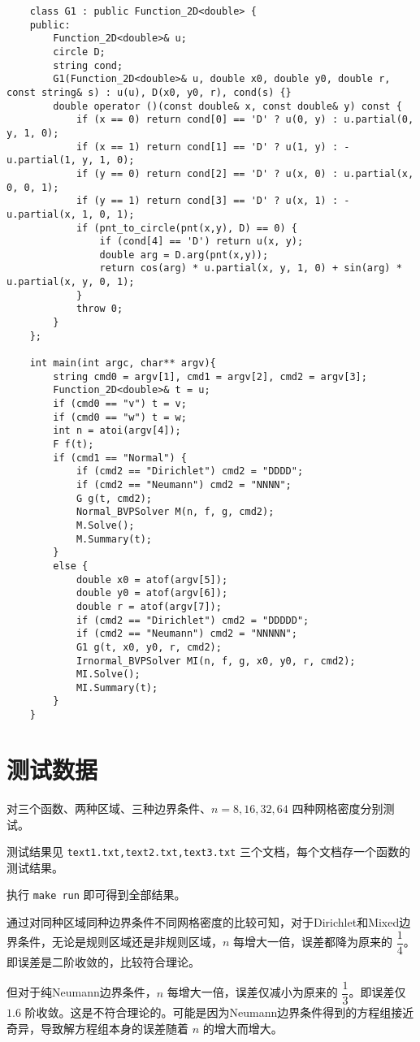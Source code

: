 \documentclass{ctexart}
\begin{document}
\begin{lstlisting}
    class G1 : public Function_2D<double> {
    public:
        Function_2D<double>& u;
        circle D;
        string cond;
        G1(Function_2D<double>& u, double x0, double y0, double r, const string& s) : u(u), D(x0, y0, r), cond(s) {}
        double operator ()(const double& x, const double& y) const {
            if (x == 0) return cond[0] == 'D' ? u(0, y) : u.partial(0, y, 1, 0);
            if (x == 1) return cond[1] == 'D' ? u(1, y) : -u.partial(1, y, 1, 0);
            if (y == 0) return cond[2] == 'D' ? u(x, 0) : u.partial(x, 0, 0, 1);
            if (y == 1) return cond[3] == 'D' ? u(x, 1) : -u.partial(x, 1, 0, 1);
            if (pnt_to_circle(pnt(x,y), D) == 0) {
                if (cond[4] == 'D') return u(x, y);
                double arg = D.arg(pnt(x,y));
                return cos(arg) * u.partial(x, y, 1, 0) + sin(arg) * u.partial(x, y, 0, 1);
            }
            throw 0;
        }
    };
    
    int main(int argc, char** argv){
        string cmd0 = argv[1], cmd1 = argv[2], cmd2 = argv[3];
        Function_2D<double>& t = u;
        if (cmd0 == "v") t = v;
        if (cmd0 == "w") t = w;
        int n = atoi(argv[4]);
        F f(t);
        if (cmd1 == "Normal") {
            if (cmd2 == "Dirichlet") cmd2 = "DDDD";
            if (cmd2 == "Neumann") cmd2 = "NNNN";
            G g(t, cmd2);
            Normal_BVPSolver M(n, f, g, cmd2);
            M.Solve();
            M.Summary(t);
        }
        else {
            double x0 = atof(argv[5]);
            double y0 = atof(argv[6]);
            double r = atof(argv[7]);
            if (cmd2 == "Dirichlet") cmd2 = "DDDDD";
            if (cmd2 == "Neumann") cmd2 = "NNNNN";
            G1 g(t, x0, y0, r, cmd2);
            Irnormal_BVPSolver MI(n, f, g, x0, y0, r, cmd2);
            MI.Solve();
            MI.Summary(t);
        }
    }
\end{lstlisting}

\section{测试数据}

对三个函数、两种区域、三种边界条件、$n=8,16,32,64$ 四种网格密度分别测试。

测试结果见 \verb|text1.txt,text2.txt,text3.txt| 三个文档，每个文档存一个函数的测试结果。

执行 \verb|make run| 即可得到全部结果。

通过对同种区域同种边界条件不同网格密度的比较可知，对于Dirichlet和Mixed边界条件，无论是规则区域还是非规则区域，$n$ 每增大一倍，误差都降为原来的 $\dfrac 14$。即误差是二阶收敛的，比较符合理论。

但对于纯Neumann边界条件，$n$ 每增大一倍，误差仅减小为原来的 $\dfrac 13$。即误差仅 $1.6$ 阶收敛。这是不符合理论的。可能是因为Neumann边界条件得到的方程组接近奇异，导致解方程组本身的误差随着 $n$ 的增大而增大。
\end{document}
